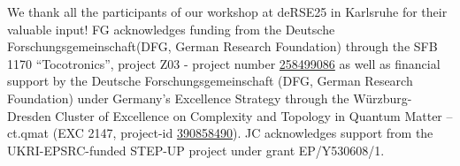 \documentclass{eceasst}
\newcommand{\geprislink}[1]{\href{https://gepris.dfg.de/gepris/projekt/#1?language=en}{#1}}
\begin{document}
\begin{acknowledge}
We thank all the participants of our workshop at deRSE25 in Karlsruhe for their valuable input!
FG acknowledges funding from the Deutsche Forschungsgemeinschaft(DFG, German Research Foundation) through the SFB 1170 “Tocotronics”, project Z03 - project number \geprislink{258499086}
as well as financial support by the Deutsche Forschungsgemeinschaft (DFG, German Research
Foundation) under Germany’s Excellence Strategy through the Würzburg-Dresden Cluster of Excellence on Complexity and Topology in Quantum Matter – ct.qmat (EXC 2147, project-id \geprislink{390858490}).
JC acknowledges support from the UKRI-EPSRC-funded STEP-UP project under grant EP/Y530608/1.
\end{acknowledge}



\end{document}
